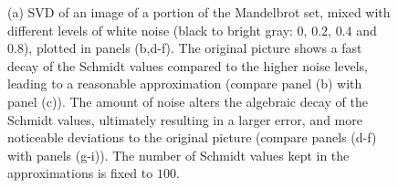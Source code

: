 \documentclass{svmono}
\begin{document}
\begin{figure}
    \caption{(a) SVD of an image of a portion of the Mandelbrot set, mixed with different levels of white noise (black to bright gray: $0$, $0.2$, $0.4$ and $0.8$), plotted in panels (b,d-f).
    The original picture shows a fast decay of the Schmidt values compared to the higher noise levels, leading to a reasonable approximation (compare panel (b) with panel (c)). The amount of noise alters the algebraic decay of the Schmidt values, ultimately resulting in a larger error, and more noticeable deviations to the original picture (compare panels (d-f) with panels (g-i)). The number of Schmidt values kept in the approximations is fixed to $100$.}
    \label{fig:svd_image_compression_mandelbrot}
\end{figure}
\end{document}
